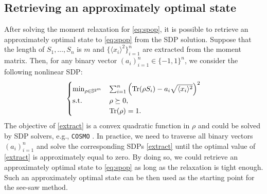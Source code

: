 \subsection{Retrieving an approximately optimal state}\label{ssec:seesaw_state}
After solving the moment relaxation for \eqref{eq:spop}, it is possible to retrieve an approximately optimal state to \eqref{eq:spop} from the SDP solution. Suppose that the length of $S_1,\ldots,S_n$ is $m$ and $\{\langle x_{i}\rangle^2\}_{i=1}^n$ are extracted from the moment matrix. Then, for any binary vector $(a_i)_{i=1}^n\in\{-1,1\}^n$, we consider the following nonlinear SDP:
\begin{equation}\label{extract}
\begin{cases}
\min_{\rho\in\mathbb{S}^{2^m}} &\sum_{i=1}^n \left(\operatorname{Tr}(\rho S_i)-a_i\sqrt{\langle x_{i}\rangle^2}\right)^2\\
\rm{s.t.}&\rho\succeq0,\\
&\operatorname{Tr}(\rho)=1.\\
\end{cases}
\end{equation}
The objective of \eqref{extract} is a convex quadratic function in $\rho$ and could be solved by SDP solvers, e.g., {\tt COSMO} \cite{Garstka_2021}. In practice, we need to traverse all binary vectors $(a_i)_{i=1}^n$ and solve the corresponding SDPs \eqref{extract} until the optimal value of \eqref{extract} is approximately equal to zero. By doing so, we could retrieve an approximately optimal state to \eqref{eq:spop} as long as the relaxation is tight enough. Such an approximately optimal state can be then used as the starting point for the see-saw method.

